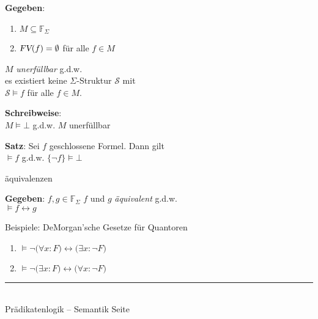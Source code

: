 \documentclass{slides}
\newcommand{\myrule}{\rule{20cm}{1mm}\\ }
\newcommand{\falsum}{\bot}
\newcommand{\FV}{\textsl{FV}}
\newcounter{mypage}
\begin{document}

\begin{slide}{}

\footnotesize
\textbf{Gegeben}:  
\begin{enumerate}
\item $M \subseteq \mathbb{F}_\Sigma$
\item $\FV(f) = \emptyset$ \quad f\"{u}r alle $f \in M$
\end{enumerate}
$M$ \emph{unerf\"{u}llbar} \quad g.d.w. \\
es existiert keine $\Sigma$-Struktur $\mathcal{S}$ mit \\[0.3cm]
\hspace*{2.3cm} $\mathcal{S} \models f$ \quad f\"{u}r alle $f \in M$.

\textbf{Schreibweise}: \\[0.1cm]
\hspace*{1.3cm} $M \models \falsum$ \quad g.d.w. $M$ unerf\"{u}llbar
\vspace{0.5cm}

\textbf{Satz}: Sei $f$ geschlossene Formel. Dann gilt \\[0.3cm]
\hspace*{1.3cm} 
$\models f$ \quad g.d.w. \quad $\{ \neg f \} \models \falsum$


\normalsize
\begin{center}
\"{a}quivalenzen  
\end{center}
\vspace{0.5cm}
\footnotesize

\textbf{Gegeben}:  $f, g \in \mathbb{F}_\Sigma$
$f$ und $g$ \emph{\"{a}quivalent} \quad g.d.w. \\[0.3cm]
\hspace*{3.3cm}  $\models f \leftrightarrow g$

Beispiele: DeMorgan'sche Gesetze f\"{u}r Quantoren
\begin{enumerate}
\item $\models \neg\big(\forall x\colon F\big) \leftrightarrow \big(\exists x\colon \neg F\big)$
\item $\models \neg\big(\exists x\colon F\big) \leftrightarrow \big(\forall x\colon \neg F\big)$
\end{enumerate}


\vspace*{\fill}
\tiny \addtocounter{mypage}{1}
\myrule
Pr\"{a}dikatenlogik -- Semantik  \hspace*{\fill} Seite 
\end{slide}
\end{document}
